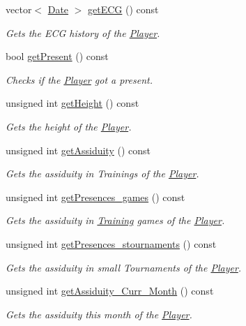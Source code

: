 \begin{DoxyCompactItemize}
vector$<$ \hyperlink{class_date}{Date} $>$ \hyperlink{class_player_a2d1d0a9a28323caa4003d1e09645389e}{get\+E\+CG} () const
\begin{DoxyCompactList}\small\item\em Gets the E\+CG history of the \hyperlink{class_player}{Player}. \end{DoxyCompactList}\item 
bool \hyperlink{class_player_a4885775d191fbfbac59cf284388c6b0b}{get\+Present} () const
\begin{DoxyCompactList}\small\item\em Checks if the \hyperlink{class_player}{Player} got a present. \end{DoxyCompactList}\item 
unsigned int \hyperlink{class_player_a35448f9c66824c2adfc643245758ce37}{get\+Height} () const
\begin{DoxyCompactList}\small\item\em Gets the height of the \hyperlink{class_player}{Player}. \end{DoxyCompactList}\item 
unsigned int \hyperlink{class_player_ad9192cb7e7d2537cdabcdc249de10e5b}{get\+Assiduity} () const
\begin{DoxyCompactList}\small\item\em Gets the assiduity in Trainings of the \hyperlink{class_player}{Player}. \end{DoxyCompactList}\item 
unsigned int \hyperlink{class_player_ae004ae4c13248265587f8a0d27ab3c5a}{get\+Presences\+\_\+games} () const
\begin{DoxyCompactList}\small\item\em Gets the assiduity in \hyperlink{class_training}{Training} games of the \hyperlink{class_player}{Player}. \end{DoxyCompactList}\item 
unsigned int \hyperlink{class_player_a0ed8ba4399f59a5e92239d61a99e1260}{get\+Presences\+\_\+stournaments} () const
\begin{DoxyCompactList}\small\item\em Gets the assiduity in small Tournaments of the \hyperlink{class_player}{Player}. \end{DoxyCompactList}\item 
unsigned int \hyperlink{class_player_a4b49e80e2c4b49276a4f5d1a38bf337c}{get\+Assiduity\+\_\+\+Curr\+\_\+\+Month} () const
\begin{DoxyCompactList}\small\item\em Gets the assiduity this month of the \hyperlink{class_player}{Player}. \end{DoxyCompactList}\item 

\end{DoxyCompactItemize}

